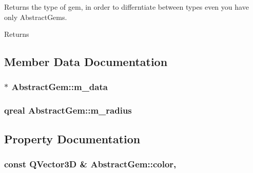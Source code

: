 Returns the type of gem, in order to differntiate between types even you have only Abstract\+Gems. 

\begin{DoxyReturn}{Returns}

\end{DoxyReturn}


\subsection{Member Data Documentation}
\hypertarget{class_abstract_gem_a10a337f732ade69f1988659852f837c6}{}
\subsubsection[{m\+\_\+data}]{$\ast$ Abstract\+Gem\+::m\+\_\+data\hspace{0.3cm}{\ttfamily [protected]}}\label{class_abstract_gem_a10a337f732ade69f1988659852f837c6}
\hypertarget{class_abstract_gem_ab058af121fa66616cab7551e9418048a}{}
\subsubsection[{m\+\_\+radius}]{\setlength{\rightskip}{0pt plus 5cm}qreal Abstract\+Gem\+::m\+\_\+radius\hspace{0.3cm}{\ttfamily [protected]}}\label{class_abstract_gem_ab058af121fa66616cab7551e9418048a}


\subsection{Property Documentation}
\hypertarget{class_abstract_gem_ae73e6ac2448549460fbc597354ab0854}{}
\subsubsection[{color}]{\setlength{\rightskip}{0pt plus 5cm}const Q\+Vector3\+D \& Abstract\+Gem\+::color\hspace{0.3cm}{\ttfamily [read]}, {\ttfamily [write]}}\label{class_abstract_gem_ae73e6ac2448549460fbc597354ab0854}
\hypertarget{class_abstract_gem_accd665898ada9bc95c886bfbcf56d9a8}{}

